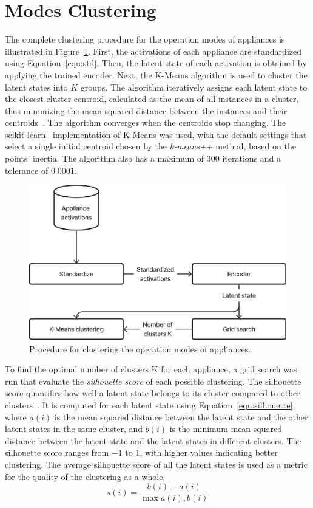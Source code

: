 \section{Modes Clustering}

The complete clustering procedure for the operation modes of appliances is illustrated in Figure~\ref{fig:clustering}. First, the activations of each appliance are standardized using Equation~\eqref{equ:std}. Then, the latent state of each activation is obtained by applying the trained encoder. Next, the K-Means algorithm is used to cluster the latent states into $K$ groups. The algorithm iteratively assigns each latent state to the closest cluster centroid, calculated as the mean of all instances in a cluster, thus minimizing the mean squared distance between the instances and their centroids~\parencite{lloydLeastSquaresQuantization1982}. The algorithm converges when the centroids stop changing. The scikit-learn~\parencite*{pedregosaScikitlearnMachineLearning2011, buitinckAPIDesignMachine2013} implementation of K-Means was used, with the default settings that select a single initial centroid chosen by the \textit{k-means++} method, based on the points’ inertia. The algorithm also has a maximum of $300$ iterations and a tolerance of $0.0001$.

\begin{figure}
  \centering
  \includegraphics[width=.5\linewidth]{images/modes_clustering/clustering.png}
  \caption{Procedure for clustering the operation modes of appliances.}
  \label{fig:clustering}
\end{figure}

To find the optimal number of clusters K for each appliance, a grid search was run that evaluate the \textit{silhouette score} of each possible clustering. The silhouette score quantifies how well a latent state belongs to its cluster compared to other clusters~\parencite{rousseeuwSilhouettesGraphicalAid1987}. It is computed for each latent state using Equation~\eqref{equ:silhouette}, where $a(i)$ is the mean squared distance between the latent state and the other latent states in the same cluster, and $b(i)$ is the minimum mean squared distance between the latent state and the latent states in different clusters. The silhouette score ranges from $-1$ to $1$, with higher values indicating better clustering. The average silhouette score of all the latent states is used as a metric for the quality of the clustering as a whole.
\begin{equation}\label{equ:silhouette}
  s(i) = \frac{b(i) - a(i)}{\max{a(i), b(i)}}
\end{equation}

